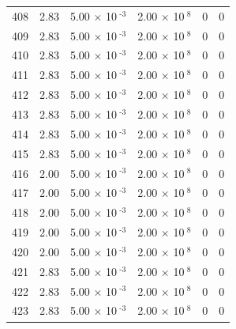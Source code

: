 \documentclass[a4paper,11pt]{article}
\begin{document}
\begin{center}
\begin{longtable}{|R{1.5cm}|R{2.4cm}|R{2.4cm}|R{2.4cm}|R{2.4cm}|R{2.4cm}|}
  408 &   2.83  &         5.00 $\times$ 10$^{\text{          -3}}$  &         2.00 $\times$ 10$^{\text{           8}}$  & 0  & 0 \\
  409 &   2.83  &         5.00 $\times$ 10$^{\text{          -3}}$  &         2.00 $\times$ 10$^{\text{           8}}$  & 0  & 0 \\
  410 &   2.83  &         5.00 $\times$ 10$^{\text{          -3}}$  &         2.00 $\times$ 10$^{\text{           8}}$  & 0  & 0 \\
  411 &   2.83  &         5.00 $\times$ 10$^{\text{          -3}}$  &         2.00 $\times$ 10$^{\text{           8}}$  & 0  & 0 \\
  412 &   2.83  &         5.00 $\times$ 10$^{\text{          -3}}$  &         2.00 $\times$ 10$^{\text{           8}}$  & 0  & 0 \\
  413 &   2.83  &         5.00 $\times$ 10$^{\text{          -3}}$  &         2.00 $\times$ 10$^{\text{           8}}$  & 0  & 0 \\
  414 &   2.83  &         5.00 $\times$ 10$^{\text{          -3}}$  &         2.00 $\times$ 10$^{\text{           8}}$  & 0  & 0 \\
  415 &   2.83  &         5.00 $\times$ 10$^{\text{          -3}}$  &         2.00 $\times$ 10$^{\text{           8}}$  & 0  & 0 \\
  416 &   2.00  &         5.00 $\times$ 10$^{\text{          -3}}$  &         2.00 $\times$ 10$^{\text{           8}}$  & 0  & 0 \\
  417 &   2.00  &         5.00 $\times$ 10$^{\text{          -3}}$  &         2.00 $\times$ 10$^{\text{           8}}$  & 0  & 0 \\
  418 &   2.00  &         5.00 $\times$ 10$^{\text{          -3}}$  &         2.00 $\times$ 10$^{\text{           8}}$  & 0  & 0 \\
  419 &   2.00  &         5.00 $\times$ 10$^{\text{          -3}}$  &         2.00 $\times$ 10$^{\text{           8}}$  & 0  & 0 \\
  420 &   2.00  &         5.00 $\times$ 10$^{\text{          -3}}$  &         2.00 $\times$ 10$^{\text{           8}}$  & 0  & 0 \\
  421 &   2.83  &         5.00 $\times$ 10$^{\text{          -3}}$  &         2.00 $\times$ 10$^{\text{           8}}$  & 0  & 0 \\
  422 &   2.83  &         5.00 $\times$ 10$^{\text{          -3}}$  &         2.00 $\times$ 10$^{\text{           8}}$  & 0  & 0 \\
  423 &   2.83  &         5.00 $\times$ 10$^{\text{          -3}}$  &         2.00 $\times$ 10$^{\text{           8}}$  & 0  & 0 \\

\end{longtable}
\end{center}
\end{document}
